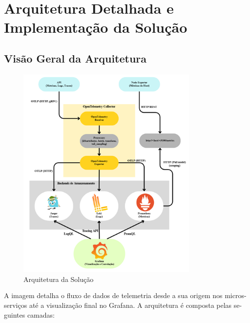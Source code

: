 \section{Arquitetura Detalhada e Implementação da Solução}

\subsection{Visão Geral da Arquitetura}

\begin{figure}[h]
    \centering
    \includegraphics[width=0.8\textwidth]{images/Diagramas/arquitetura da solução.png}
    \caption{Arquitetura da Solução}
\end{figure}

A imagem detalha o fluxo de dados de telemetria desde a sua origem nos micros-serviços até a visualização final no Grafana. A arquitetura é composta pelas se-guintes camadas:


